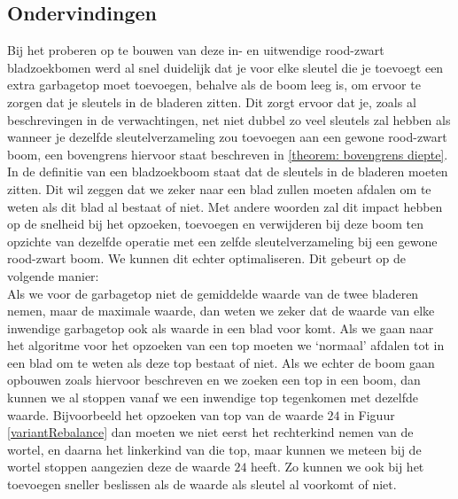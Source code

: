 \documentclass[11pt,a4paper]{report}
\begin{document}
\subsection{Ondervindingen}
\label{ondervindingen}
Bij het proberen op te bouwen van deze in- en uitwendige rood-zwart bladzoekbomen werd al snel duidelijk dat je voor elke sleutel die je toevoegt een extra garbagetop moet toevoegen, behalve als de boom leeg is, om ervoor te zorgen dat je sleutels in de bladeren zitten. Dit zorgt ervoor dat je, zoals al beschrevingen in de verwachtingen, net niet dubbel zo veel sleutels zal hebben als wanneer je dezelfde sleutelverzameling zou toevoegen aan een gewone rood-zwart boom, een bovengrens hiervoor staat beschreven in \ref{theorem: bovengrens diepte}.\\
In de definitie van een bladzoekboom staat dat de sleutels in de bladeren moeten zitten. Dit wil zeggen dat we zeker naar een blad zullen moeten afdalen om te weten als dit blad al bestaat of niet. Met andere woorden zal dit impact hebben op de snelheid bij het opzoeken, toevoegen en verwijderen bij deze boom ten opzichte van dezelfde operatie met een zelfde sleutelverzameling bij een gewone rood-zwart boom. We kunnen dit echter optimaliseren. Dit gebeurt op de volgende manier:\\
Als we voor de garbagetop niet de gemiddelde waarde van de twee bladeren nemen, maar de maximale waarde, dan weten we zeker dat de waarde van elke inwendige garbagetop ook als waarde in een blad voor komt. Als we gaan naar het algoritme voor het opzoeken van een top moeten we `normaal' afdalen tot in een blad om te weten als deze top bestaat of niet. Als we echter de boom gaan opbouwen zoals hiervoor beschreven en we zoeken een top in een boom, dan kunnen we al stoppen vanaf we een inwendige top tegenkomen met dezelfde waarde. Bijvoorbeeld het opzoeken van top van de waarde $24$ in Figuur \ref{variantRebalance} dan moeten we niet eerst het rechterkind nemen van de wortel, en daarna het linkerkind van die top, maar kunnen we meteen bij de wortel stoppen aangezien deze de waarde $24$ heeft. Zo kunnen we ook bij het toevoegen sneller beslissen als de waarde als sleutel al voorkomt of niet.
\end{document}
